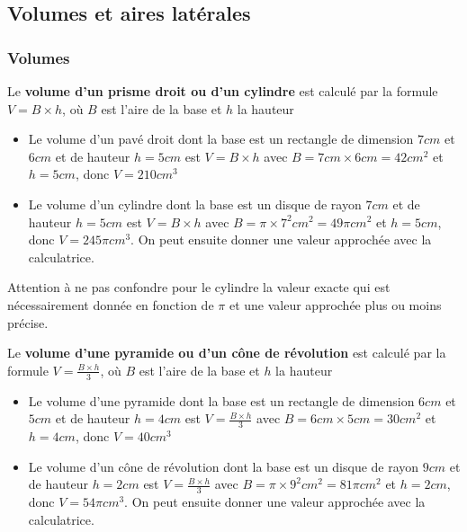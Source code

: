 

\subsection{Volumes et aires latérales}
\subsubsection{Volumes}
\begin{shaded}
\begin{Pp} 
Le \textbf{volume d'un prisme droit ou d'un cylindre} est calculé par la formule \textbf{$V=B \times h$}, où $B$ est l'aire de la base et $h$ la hauteur
\end{Pp}
\end{shaded}

\begin{Ex}
\begin{itemize}
\item Le volume d'un pavé droit dont la base est un rectangle de dimension $7 cm$ et $6 cm$ et de hauteur $h=5 cm$ est $V=B \times h$ avec $B=7 cm \times 6 cm=42 cm^2$ et $h=5 cm$, donc $V=210 cm^3$
\item Le volume d'un cylindre dont la base est un disque de rayon $7 cm$ et de hauteur $h=5 cm$ est $V=B \times h$ avec $B=\pi \times 7^2 cm^2=49 \pi cm^2$ et $h=5 cm$, donc $V=245 \pi cm^3$. On peut ensuite donner une valeur approchée avec la calculatrice.
\end{itemize}
\end{Ex}

\begin{Rq}
Attention à ne pas confondre pour le cylindre la valeur exacte qui est nécessairement donnée en fonction de $\pi$ et une valeur approchée plus ou moins précise.
\end{Rq}

\begin{shaded}
\begin{Pp} 
Le \textbf{volume d'une pyramide ou d'un cône de révolution} est calculé par la formule \textbf{$V=\frac {B \times h}{3}$}, où $B$ est l'aire de la base et $h$ la hauteur
\end{Pp}
\end{shaded}

\begin{Ex}
\begin{itemize}
\item Le volume d'une pyramide dont la base est un rectangle de dimension $6 cm$ et $5 cm$ et de hauteur $h=4 cm$ est $V=\frac {B \times h}{3}$ avec $B=6 cm \times 5 cm=30 cm^2$ et $h=4 cm$, donc $V=40 cm^3$
\item Le volume d'un cône de révolution dont la base est un disque de rayon $9 cm$ et de hauteur $h=2 cm$ est $V=\frac {B \times h}{3}$ avec $B=\pi \times 9^2 cm^2=81 \pi cm^2$ et $h=2 cm$, donc $V=54 \pi cm^3$. On peut ensuite donner une valeur approchée avec la calculatrice.
\end{itemize}
\end{Ex}

